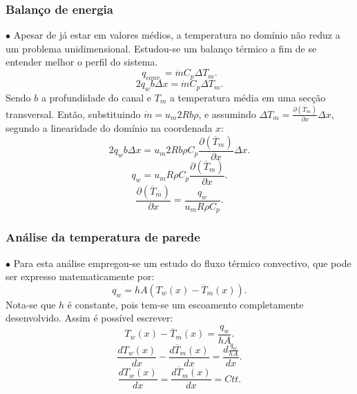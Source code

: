 \documentclass[xcolor=dvipsnames,10pt,aspectratio=169]{beamer}
\begin{document}
		
	
	
	
		\begin{frame}
		\frametitle{Balanço de energia}
		$\bullet$ Apesar de já estar em valores médios, a temperatura no domínio não reduz a um problema unidimensional. Estudou-se um balanço térmico a fim de se entender melhor o perfil do sistema.
		\begin{equation}\label{c_h_e}
		q_{conv.} = \dot{m} C_p \Delta T_m.
		\end{equation}
		\begin{equation}
		2q_w b \Delta x = \dot{m} C_p \Delta T_m.
		\end{equation}
		Sendo $b$ a profundidade do canal e $T_m$ a temperatura média em uma secção transversal. Então, substituindo $ \dot{m} = u_m 2R b \rho $, e assumindo $ \Delta T_m = \frac{\partial{\left(\overline{T}_m\right)}}{\partial{x}} \Delta x $, segundo a linearidade do domínio na coordenada $ x $:
		\begin{equation}
		2q_w b \Delta x = u_m 2R b \rho  C_p \frac{\partial{\left(\overline{T}_m\right)}}{\partial{x}} \Delta x.
		\end{equation}     
		\begin{equation}
		q_w = u_m R \rho  C_p \frac{\partial{\left(\overline{T}_m\right)}}{\partial{x}} .
		\end{equation} 
		\begin{equation}\label{c_h_ee}
		\frac{\partial{\left(\overline{T}_m\right)}}{\partial{x}} = \frac{q_w}{u_m  R \rho  C_p } .
		\end{equation} 
		\end{frame}
	
	
	
	
		\begin{frame}
		\frametitle{Análise da temperatura de parede}
		$\bullet$ Para esta análise empregou-se um estudo do fluxo térmico convectivo, que pode ser expresso matematicamente por:
		\begin{equation}
		q_w = h A \left( T_w(x) - \overline{T}_m(x)\right).
		\end{equation}
		Nota-se que $h$ é constante, pois tem-se um escoamento completamente desenvolvido. Assim é possível escrever:
		\begin{equation}
		 T_w(x) - \overline{T}_m(x) = \frac{q_w}{hA}.
		\end{equation}
		\begin{equation}
		\frac{d T_w(x)}{d x} - \frac{d \overline{T}_m(x)}{d x} = \frac{d \frac{q_w}{hA}}{dx}.
		\end{equation}
		\begin{equation}
		\frac{d T_w(x)}{d x} = \frac{d \overline{T}_m(x)}{d x} = Ctt.
		\end{equation}	
		\end{frame}
	
\end{document}
